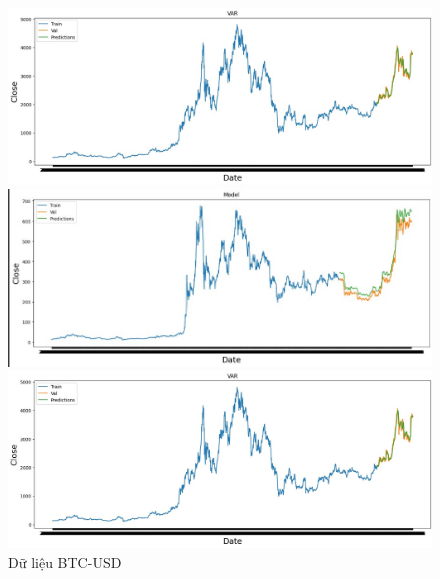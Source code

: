 \documentclass[conference]{IEEEtran}
\begin{document}
	\begin{figure}[H]
		\centering
		\begin{minipage}{0.15\textwidth}
			\centering
			\includegraphics[width=1\textwidth]{Figure/BTC_VAR.jpg}
		\end{minipage}
		\hfill
		\begin{minipage}{0.15\textwidth}
			\centering
			\includegraphics[width=1\textwidth]{Figure/VAR_I.jpg}
		\end{minipage}
		\hfill
		\begin{minipage}{0.15\textwidth}
			\centering
			\includegraphics[width=1\textwidth]{Figure/BNB_VAR.jpg}
		\end{minipage}
		\caption{Dữ liệu BTC-USD}
		\label{fig:1}
	\end{figure}
	
\end{document}
